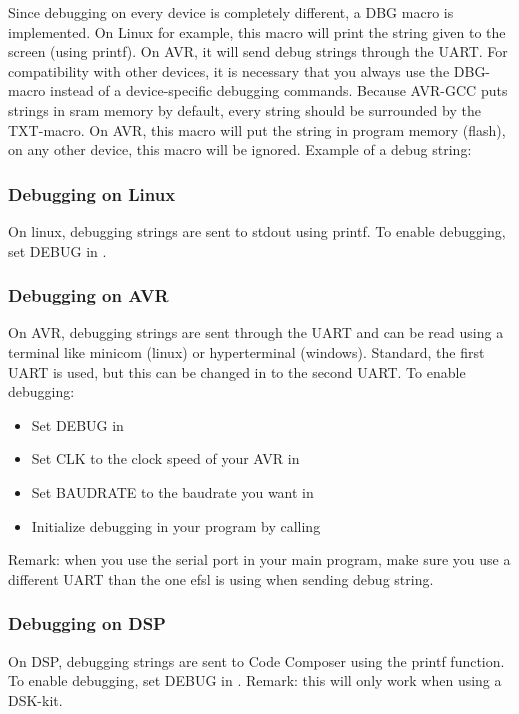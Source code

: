 Since debugging on every device is completely different, a DBG macro is
implemented. On Linux for example, this macro will print the string given
to the screen (using printf). On AVR, it will send debug strings through the
UART. For compatibility with other devices, it is necessary that you always use
the DBG-macro instead of a device-specific debugging commands.\newline
\newline
Because AVR-GCC puts strings in sram memory by default, every string should be
surrounded by the TXT-macro. On AVR, this macro will put the string in program
memory (flash), on any other device, this macro will be ignored.\newline
\newline
Example of a debug string:\\

\subsubsection{Debugging on Linux}
On linux, debugging strings are sent to stdout using printf.\newline
\newline
To enable debugging, set DEBUG in .
\subsubsection{Debugging on AVR}
On AVR, debugging strings are sent through the UART and can be read using
a terminal like minicom (linux) or hyperterminal (windows). Standard, the
first UART is used, but this can be changed in  to the
second UART.\newline
\newline
To enable debugging:
\begin{itemize}
	\item{Set DEBUG in }
	\item{Set CLK to the clock speed of your AVR in }
	\item{Set BAUDRATE to the baudrate you want in }
	\item{Initialize debugging in your program by calling }
\end{itemize}
Remark: when you use the serial port in your main program, make sure you
use a different UART than the one efsl is using when sending debug string.
\subsubsection{Debugging on DSP}
On DSP, debugging strings are sent to Code Composer using the printf function.
\newline\newline
To enable debugging, set DEBUG in .\newline
\newline
Remark: this will only work when using a DSK-kit.
